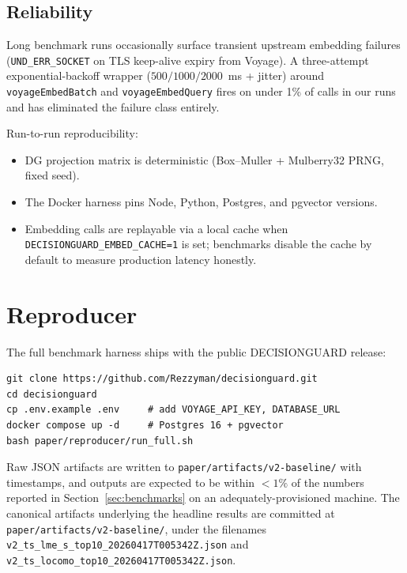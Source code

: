 \documentclass{article}
\begin{document}
\subsection{Reliability}

Long benchmark runs occasionally surface transient upstream embedding
failures (\texttt{UND\_ERR\_SOCKET} on TLS keep-alive expiry from
Voyage). A three-attempt exponential-backoff wrapper
($500 / 1000 / 2000$~ms + jitter) around \texttt{voyageEmbedBatch} and
\texttt{voyageEmbedQuery} fires on under 1\% of calls in our runs and
has eliminated the failure class entirely.

Run-to-run reproducibility:

\begin{itemize}
  \item DG projection matrix is deterministic (Box--Muller + Mulberry32
        PRNG, fixed seed).
  \item The Docker harness pins Node, Python, Postgres, and pgvector
        versions.
  \item Embedding calls are replayable via a local cache when
        \texttt{DECISIONGUARD\_EMBED\_CACHE=1} is set; benchmarks disable the
        cache by default to measure production latency honestly.
\end{itemize}

\section{Reproducer}
\label{sec:reproducer}

The full benchmark harness ships with the public DECISIONGUARD release:

\begin{verbatim}
git clone https://github.com/Rezzyman/decisionguard.git
cd decisionguard
cp .env.example .env     # add VOYAGE_API_KEY, DATABASE_URL
docker compose up -d     # Postgres 16 + pgvector
bash paper/reproducer/run_full.sh
\end{verbatim}

Raw JSON artifacts are written to
\texttt{paper/artifacts/v2-baseline/} with timestamps, and outputs are
expected to be within $< 1\%$ of the numbers reported in
Section~\ref{sec:benchmarks} on an adequately-provisioned machine. The
canonical artifacts underlying the headline results are committed at
\texttt{paper/artifacts/v2-baseline/}, under the filenames
\texttt{v2\_ts\_lme\_s\_top10\_20260417T005342Z.json} and
\texttt{v2\_ts\_locomo\_top10\_20260417T005342Z.json}.
\end{document}
